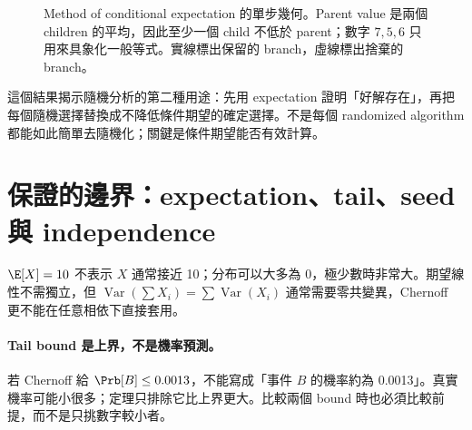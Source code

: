 \documentclass[11pt,a4paper,oneside,openany]{book}
\begin{document}
\begin{figure}[htbp]
\centering
{}
\caption{Method of conditional expectation 的單步幾何。Parent value 是兩個 children 的平均，因此至少一個 child 不低於 parent；數字 $7,5,6$ 只用來具象化一般等式。實線標出保留的 branch，虛線標出捨棄的 branch。}
\label{fig:conditional-expectation-step}
\end{figure}

這個結果揭示隨機分析的第二種用途：先用 expectation 證明「好解存在」，再把每個隨機選擇替換成不降低條件期望的確定選擇。不是每個 randomized algorithm 都能如此簡單去隨機化；關鍵是條件期望能否有效計算。

\section{保證的邊界：expectation、tail、seed 與 independence}
\begin{misconception}
$\E[X]=10$ 不表示 $X$ 通常接近 10；分布可以大多為 0，極少數時非常大。期望線性不需獨立，但 $\operatorname{Var}(\sum X_i)=\sum\operatorname{Var}(X_i)$ 通常需要零共變異，Chernoff 更不能在任意相依下直接套用。
\end{misconception}

\paragraph{Tail bound 是上界，不是機率預測。}
若 Chernoff 給 $\Prb[B]\le0.0013$，不能寫成「事件 $B$ 的機率約為 0.0013」。真實機率可能小很多；定理只排除它比上界更大。比較兩個 bound 時也必須比較前提，而不是只挑數字較小者。
\end{document}
